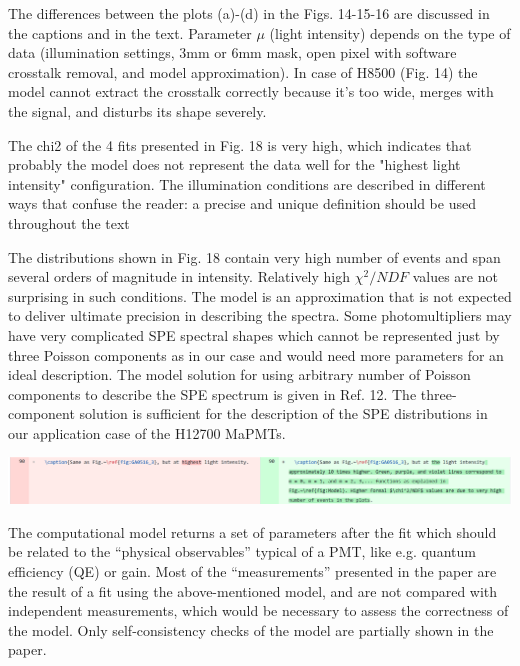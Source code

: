 \documentclass[11pt]{report}
\begin{document}
The differences between the plots (a)-(d) in the Figs. 14-15-16 are discussed in the captions and in the text.
Parameter $\mu$ (light intensity) depends on the type of data (illumination settings, 3mm or 6mm mask, open pixel with software crosstalk removal, and model approximation).
In case of H8500 (Fig. 14) the model cannot extract the crosstalk correctly because it's too wide, merges with the signal, and disturbs its shape severely.



\begin{tcolorbox}[enlarge top by=2em,colbacktitle=black!60!white,colframe=black!80!white,left=0pt,right=0pt,top=0pt,bottom=0pt,boxrule=0.3pt,title=\bfseries2.08]
The chi2 of the 4 fits presented in Fig. 18 is very high, which indicates that probably the model does not represent the data well for the "highest light intensity" configuration. The illumination conditions are described in different ways that confuse the reader: a precise and unique definition should be used throughout the text
\end{tcolorbox}

 The distributions shown in Fig. 18 contain very high number of events and span several orders of magnitude in intensity. Relatively high $\chi^2/NDF$ values are not surprising in such conditions. The model is an approximation that is not expected to deliver ultimate precision in describing the spectra. Some photomultipliers may have very complicated SPE spectral shapes which cannot be represented just by three Poisson components as in our case and would need more parameters for an ideal description. The model solution for using arbitrary number of Poisson components to describe the SPE spectrum is given in Ref. 12. The three-component solution is sufficient for the description of the SPE distributions in our application case of the H12700 MaPMTs.
 

\includegraphics[width=\linewidth]{round1/2.08.png}



\newpage
\begin{tcolorbox}[enlarge top by=2em,colbacktitle=red!60!white,colframe=black!80!white,left=0pt,right=0pt,top=0pt,bottom=0pt,boxrule=0.3pt,title=\bfseries2.09]
The computational model returns a set of parameters after the fit which should be related to the ``physical observables'' typical of a PMT, like e.g. quantum efficiency (QE) or gain. Most of the ``measurements'' presented in the paper are the result of a fit using the above-mentioned model, and are not compared with independent measurements, which would be necessary to assess the correctness of the model. Only self-consistency checks of the model are partially shown in the paper. 
\end{tcolorbox}
\end{document}
